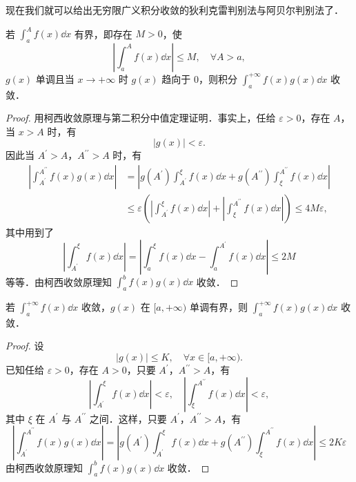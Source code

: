 现在我们就可以给出无穷限广义积分收敛的狄利克雷判别法与阿贝尔判别法了．

\begin{theorem}[狄利克雷判别法]\label{thm:11-6}
若 $\displaystyle\int_{a}^{A}f(x)\dd x$ 有界，即存在 $M>0$，使
\[
\left|\int_{a}^{A}f(x)\dd x\right|\leqslant M,\quad\forall A>a,
\]
$g(x)$ 单调且当 $x\to+\infty$ 时 $g(x)$ 趋向于 $0$，则积分 $\displaystyle\int_{a}^{+\infty}f(x)g(x)\dd x$ 收敛．
\end{theorem}

\begin{proof}
用柯西收敛原理与第二积分中值定理证明．事实上，任给 $\varepsilon>0$，存在 $A$，当 $x>A$ 时，有
\[
\left|g(x)\right|<\varepsilon.
\]
因此当 $A^{\prime}>A$，$A^{\prime\prime}>A$ 时，有
\[
\begin{aligned}
\left|\int_{A^{\prime}}^{A^{\prime\prime}}f(x)g(x)\dd x\right|
&=\left|g(A^{\prime})\int_{A^{\prime}}^{\xi}f(x)\dd x+g(A^{\prime\prime})\int_{\xi}^{A^{\prime\prime}}f(x)\dd x\right|\\
&\leqslant\varepsilon\left(\left|\int_{A^{\prime}}^{\xi}f(x)\dd x\right|+\left|\int_{\xi}^{A^{\prime\prime}}f(x)\dd x\right|\right)\leqslant 4M\varepsilon,
\end{aligned}
\]
其中用到了
\[
\left|\int_{A^{\prime}}^{\xi}f(x)\dd x\right|=\left|\int_{a}^{\xi}f(x)\dd x-\int_{a}^{A^{\prime}}f(x)\dd x\right|\leqslant 2M
\]
等等．由柯西收敛原理知 $\displaystyle\int_{a}^{b}f(x)g(x)\dd x$ 收敛．
\end{proof}

\begin{theorem}[阿贝尔判别法]\label{thm:11-7}
若 $\displaystyle\int_{a}^{+\infty}f(x)\dd x$ 收敛，$g(x)$ 在 $[a,+\infty)$ 单调有界，则 $\displaystyle\int_{a}^{+\infty}f(x)g(x)\dd x$ 收敛．
\end{theorem}

\begin{proof}
设
\[
\left|g(x)\right|\leqslant K,\quad\forall x\in[a,+\infty).
\]
已知任给 $\varepsilon>0$，存在 $A>0$，只要 $A^{\prime}$，$A^{\prime\prime}>A$，有
\[
\left|\int_{A^{\prime}}^{\xi}f(x)\dd x\right|<\varepsilon,\quad\left|\int_{\xi}^{A^{\prime\prime}}f(x)\dd x\right|<\varepsilon,
\]
其中 $\xi$ 在 $A^{\prime}$ 与 $A^{\prime\prime}$ 之间．这样，只要 $A^{\prime}$，$A^{\prime\prime}>A$，有
\[
\left|\int_{A^{\prime}}^{A^{\prime\prime}}f(x)g(x)\dd x\right|=\left|g(A^{\prime})\int_{A^{\prime}}^{\xi}f(x)\dd x+g(A^{\prime\prime})\int_{\xi}^{A^{\prime\prime}}f(x)\dd x\right|\leqslant 2K\varepsilon
\]
由柯西收敛原理知 $\displaystyle\int_{a}^{b}f(x)g(x)\dd x$ 收敛．
\end{proof}

